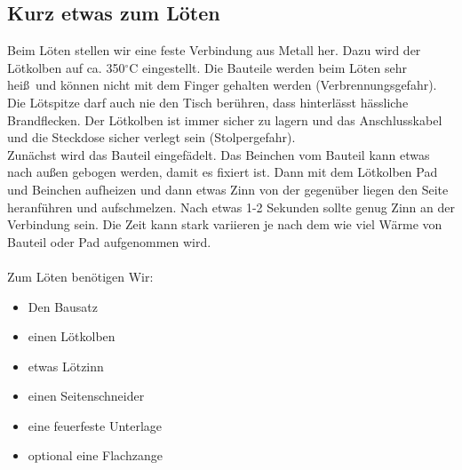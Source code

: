 \documentclass[a4paper]{article}
\begin{document}
\subsection{Kurz etwas zum Löten}
Beim Löten stellen wir eine feste Verbindung aus Metall her. Dazu wird der Lötkolben auf ca. 350$^{\circ}$C eingestellt. Die Bauteile werden beim Löten sehr hei\ss \ und können nicht mit dem Finger gehalten werden (Verbrennungsgefahr). Die Lötspitze darf auch nie den Tisch berühren, dass hinterlässt hässliche Brandflecken. Der Lötkolben ist immer sicher zu lagern und das Anschlusskabel und die Steckdose sicher verlegt sein (Stolpergefahr).\\
Zunächst wird das Bauteil eingefädelt. Das Beinchen vom Bauteil kann etwas nach au\ss en gebogen werden, damit es fixiert ist. Dann mit dem Lötkolben Pad und Beinchen aufheizen und dann etwas Zinn von der gegenüber liegen den Seite heranführen und aufschmelzen. Nach etwas 1-2 Sekunden sollte genug Zinn an der Verbindung sein. Die Zeit kann stark variieren je nach dem wie viel Wärme von Bauteil oder Pad aufgenommen wird.\\
\ \\
Zum Löten benötigen Wir:
\begin{itemize}
  \item     Den Bausatz
  \item     einen Lötkolben
  \item     etwas Lötzinn
  \item     einen Seitenschneider
  \item     eine feuerfeste Unterlage
  \item     optional eine Flachzange
\end{itemize}
\end{document}
